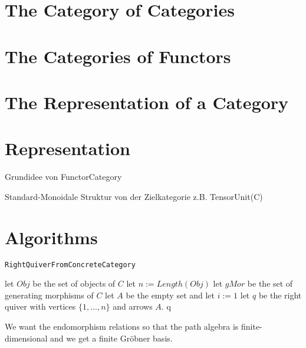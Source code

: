 \documentclass{article}
\theoremstyle{definition}
\begin{document}
\section{The Category of Categories}

\section{The Categories of Functors}

\section{The Representation of a Category}

\section{Representation}

Grundidee von FunctorCategory

Standard-Monoidale Struktur von der Zielkategorie z.B. TensorUnit(C)

\section{Algorithms}

\begin{algorithm}\capstart
    \caption{\texttt{RightQuiverFromConcreteCategory}}\label{algo:RightQuiverFromConcreteCategory}
	\BlankLine
	let $Obj$ be the set of objects of $C$\;
	let $n := Length(Obj)$\;
	let $gMor$ be the set of generating morphisms of $C$\;
	let $A$ be the empty set and let $i := 1$\;
	\BlankLine
	let $q$ be the right quiver with vertices $\{1,\dots,n\}$ and arrows $A$.
	\BlankLine
	\Return q\;
\end{algorithm}

We want the endomorphism relations so that the path algebra is finite-dimensional and we
get a finite Gröbner basis.
\end{document}
